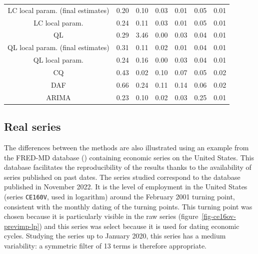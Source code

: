 \documentclass[
]{article}
\newcommand\1{\mathds{1}}
\begin{document}
\begin{table}
{\begin{tabular}{ccccccc}
\hspace{1em}LC local param. (final estimates) & 0.20 & 0.10 & 0.03 & 0.01 & 0.05 & 0.01\\
\hspace{1em}LC local param. & 0.24 & 0.11 & 0.03 & 0.01 & 0.05 & 0.01\\
\hspace{1em}QL & 0.29 & 3.46 & 0.00 & 0.03 & 0.04 & 0.01\\
\hspace{1em}QL local param. (final estimates) & 0.31 & 0.11 & 0.02 & 0.01 & 0.04 & 0.01\\
\hspace{1em}QL local param. & 0.24 & 0.16 & 0.00 & 0.03 & 0.04 & 0.01\\
\hspace{1em}CQ & 0.43 & 0.02 & 0.10 & 0.07 & 0.05 & 0.02\\
\hspace{1em}DAF & 0.66 & 0.24 & 0.11 & 0.14 & 0.06 & 0.02\\
\hspace{1em}ARIMA & 0.23 & 0.10 & 0.02 & 0.03 & 0.25 & 0.01\\
\bottomrule
\end{tabular}

}

\end{table}%

\subsection{Real series}\label{real-series}

The differences between the methods are also illustrated using an
example from the FRED-MD database (\textcite{fredmd}) containing
economic series on the United States. This database facilitates the
reproducibility of the results thanks to the availability of series
published on past dates. The series studied correspond to the database
published in November 2022. It is the level of employment in the United
States (series \texttt{CE160V}, used in logarithm) around the February
2001 turning point, consistent with the monthly dating of the turning
points. This turning point was chosen because it is particularly visible
in the raw series (figure~\ref{fig-ce16ov-previmp-lp}) and this series
was select because it is used for dating economic cycles. Studying the
series up to January 2020, this series has a medium variability: a
symmetric filter of 13 terms is therefore appropriate.
\end{document}
